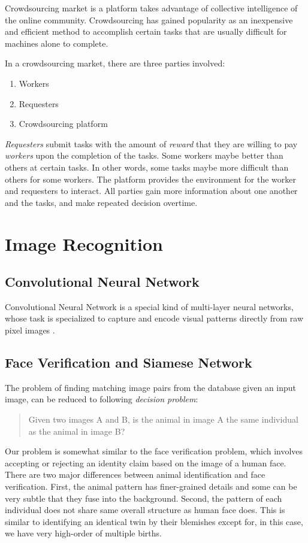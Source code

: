 Crowdsourcing market is a platform takes advantage of collective intelligence
of the online community. Crowdsourcing has gained popularity as an inexpensive
and efficient method to accomplish certain tasks that are usually difficult for
machines alone to complete.

In a crowdsourcing market, there are three parties involved:
\begin{enumerate}
	\item Workers
	\item Requesters
	\item Crowdsourcing platform
\end{enumerate}

\emph{Requesters} submit tasks with the amount of \emph{reward} that they are
willing to pay \emph{workers} upon the completion of the tasks. Some workers
maybe better than others at certain tasks. In other words, some tasks maybe
more difficult than others for some workers. The platform provides the
environment for the worker and requesters to interact. All parties gain more
information about one another and the tasks, and make repeated decision
overtime.

\section{Image Recognition}

\subsection{Convolutional Neural Network}

Convolutional Neural Network is a special kind of multi-layer neural networks,
whose task is specialized to capture and encode visual patterns directly from
raw pixel images \cite{lecun95}. 

\subsection{Face Verification and Siamese Network}

The problem of finding matching image pairs from the database given an input
image, can be reduced to following \emph{decision problem}:
\begin{quote}
\centering
Given two images A and B, is the animal in image A the same individual as the
animal in image B?
\end{quote}

Our problem is somewhat similar to the face verification problem, which
involves accepting or rejecting an identity claim based on the image of a human
face. There are two major differences between animal identification and face
verification. First, the animal pattern has finer-grained details and some can
be very subtle that they fuse into the background. Second, the pattern of each
individual does not share same overall structure as human face does. This is
similar to identifying an identical twin by their blemishes except for, in this
case, we have very high-order of multiple births.

